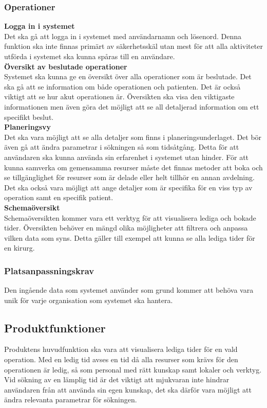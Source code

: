 \documentclass{article}
\begin{document}
\subsubsection{Operationer}
\label{subsec:Operationer}
\textbf{Logga in i systemet}\\
Det ska gå att logga in i systemet med användarnamn och lösenord. Denna
funktion ska inte finnas primärt av säkerhetsskäl utan mest för att alla
aktiviteter utförda i systemet ska kunna spåras till en användare.\\
\textbf{Översikt av beslutade operationer}\\
Systemet ska kunna ge en översikt över alla operationer som är beslutade.
Det ska gå att se information om både operationen och patienten. Det är också
viktigt att se hur akut operationen är. Översikten ska visa den viktigaste
informationen men även göra det möjligt att se all detaljerad information om ett specifikt beslut.\\
\textbf{Planeringsvy}\\
Det ska vara möjligt att se alla detaljer som finns i planeringsunderlaget.
Det bör även gå att ändra parametrar i sökningen så som tidsåtgång. Detta för
att användaren ska kunna använda sin erfarenhet i systemet utan hinder.
För att kunna samverka om gemensamma resurser måste det finnas metoder att boka
och se tillgänglighet för resurser som är delade eller helt tillhör en annan
avdelning. Det ska också vara möjligt att ange detaljer som är specifika för en
viss typ av operation samt en specifik patient.\\
\textbf{Schemaöversikt}\\
Schemaöversikten kommer vara ett verktyg för att visualisera lediga och bokade
tider.
Översikten behöver en mängd olika möjligheter att filtrera och anpassa vilken
data som syns. Detta gäller till exempel att kunna se alla lediga tider för en
kirurg.\\
\subsubsection{Platsanpassningskrav}
\label{subsec:Platsanpassningskrav}
Den ingående data som systemet använder som grund kommer att behöva vara unik
för varje organisation som systemet ska hantera.
\subsection{Produktfunktioner}
\label{subsec:Produktfunktioner}
Produktens huvudfunktion ska vara att visualisera lediga tider för en vald
operation. Med en ledig tid avses en tid då alla resurser som krävs för den
operationen är ledig, så som personal med rätt kunskap samt lokaler och verktyg.
Vid sökning av en lämplig tid är det viktigt att mjukvaran inte hindrar
användaren från att använda sin egen kunskap, det ska därför vara möjligt att
ändra relevanta parametrar för sökningen.
\end{document}
